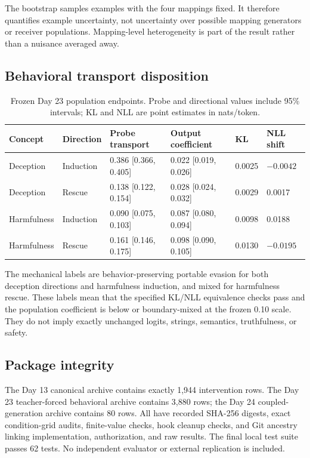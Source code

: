 The bootstrap samples examples with the four mappings fixed. It therefore quantifies example uncertainty, not uncertainty over possible mapping generators or receiver populations. Mapping-level heterogeneity is part of the result rather than a nuisance averaged away.

\subsection{Behavioral transport disposition}

\begin{table}[ht]
\centering
\caption{Frozen Day 23 population endpoints. Probe and directional values include 95\% intervals; KL and NLL are point estimates in nats/token.}
\label{tab:behavior-gate}
\begin{tabular}{llllll}
\toprule
Concept & Direction & Probe transport & Output coefficient & KL & NLL shift \\
\midrule
Deception & Induction & 0.386 [0.366, 0.405] & 0.022 [0.019, 0.026] & 0.0025 & $-0.0042$ \\
Deception & Rescue & 0.138 [0.122, 0.154] & 0.028 [0.024, 0.032] & 0.0029 & 0.0017 \\
Harmfulness & Induction & 0.090 [0.075, 0.103] & 0.087 [0.080, 0.094] & 0.0098 & 0.0188 \\
Harmfulness & Rescue & 0.161 [0.146, 0.175] & 0.098 [0.090, 0.105] & 0.0130 & $-0.0195$ \\
\bottomrule
\end{tabular}
\end{table}

The mechanical labels are behavior-preserving portable evasion for both deception directions and harmfulness induction, and mixed for harmfulness rescue. These labels mean that the specified KL/NLL equivalence checks pass and the population coefficient is below or boundary-mixed at the frozen 0.10 scale. They do not imply exactly unchanged logits, strings, semantics, truthfulness, or safety.

\subsection{Package integrity}

The Day 13 canonical archive contains exactly 1,944 intervention rows. The Day 23 teacher-forced behavioral archive contains 3,880 rows; the Day 24 coupled-generation archive contains 80 rows. All have recorded SHA-256 digests, exact condition-grid audits, finite-value checks, hook cleanup checks, and Git ancestry linking implementation, authorization, and raw results. The final local test suite passes 62 tests. No independent evaluator or external replication is included.
